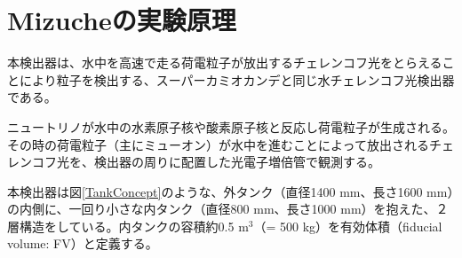 \documentclass[11pt]{ltjsreport}
\newcommand{\figref}[1]{図\ref{#1}}
\newcommand{\red}[1]{\textcolor{red}{\textbf{#1}}}
\newcommand{\comment}[1]{\red{#1}\footnote{\red{#1}}}
\begin{document}


\section{Mizucheの実験原理}

本検出器は、水中を高速で走る荷電粒子が放出するチェレンコフ光をとらえることにより粒子を検出する、スーパーカミオカンデと同じ水チェレンコフ光検出器である。

ニュートリノが水中の水素原子核や酸素原子核と反応し荷電粒子が生成される。その時の荷電粒子（主にミューオン）が水中を進むことによって放出されるチェレンコフ光を、検出器の周りに配置した光電子増倍管で観測する。


本検出器は\figref{TankConcept}のような、外タンク（直径1400 mm、長さ1600 mm）の内側に、一回り小さな内タンク（直径800 mm、長さ1000 mm）を抱えた、２層構造をしている。内タンクの容積約0.5 m$^{3}$（= 500 kg）を有効体積（fiducial volume: FV）と定義する。
\end{document}
